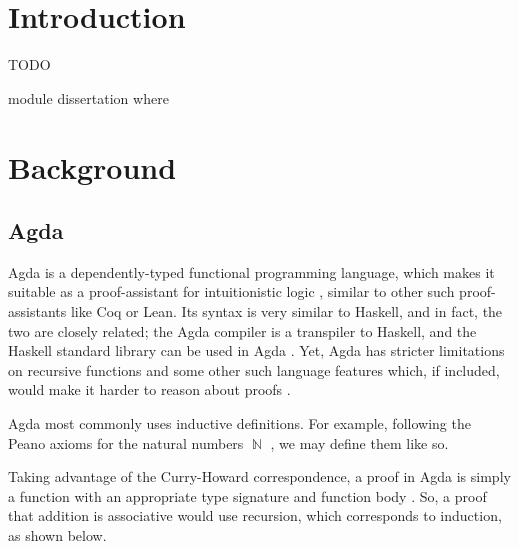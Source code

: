 \documentclass[logo,bsc,singlespacing,parskip,online]{infthesis}
\DeclareMathOperator{\nat}{\mathbb{N}}
\renewenvironment{code}{\mintedcopy[breaklines]{agda}}{\endmintedcopy}
\begin{document}
\chapter{Introduction}

TODO

\begin{code}
module dissertation where
\end{code}

\chapter{Background}

\section{Agda}
Agda is a dependently-typed functional programming language, which makes it
suitable as a proof-assistant for intuitionistic logic
\citep{norell_towards_2007}, similar to other such proof-assistants like Coq or
Lean. Its syntax is very similar to Haskell, and in fact, the two are closely
related; the Agda compiler is a transpiler to Haskell, and the Haskell standard
library can be used in Agda \citep{kusee_compiling_2017}. Yet, Agda has stricter
limitations on recursive functions and some other such language features which,
if included, would make it harder to reason about proofs
\citep{berghofer_brief_2009}.

Agda most commonly uses inductive definitions. For example, following the Peano
axioms for the natural numbers $\nat$ \citep{boolos_freges_1995}, we may define
them like so.



Taking advantage of the Curry-Howard correspondence, a proof in Agda is simply a
function with an appropriate type signature and function body
\citep{wadler_propositions_2015}. So, a proof that addition is associative would
use recursion, which corresponds to induction, as shown below.


\end{document}

